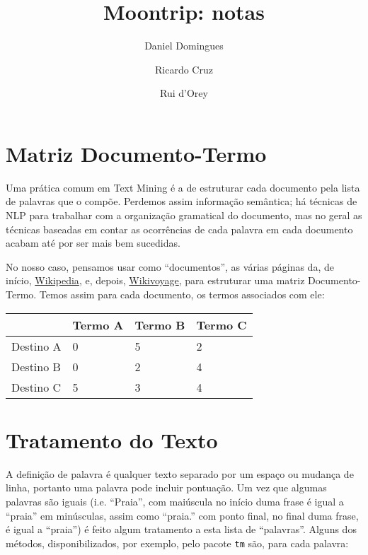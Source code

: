 \documentclass[twocolumn]{article}
\title{Moontrip: notas}
\author{Daniel Domingues \and Ricardo Cruz \and Rui d'Orey}
\begin{document}
\maketitle

\section{Matriz Documento-Termo}

Uma prática comum em Text Mining é a de estruturar cada documento pela lista de palavras que o compõe. Perdemos assim informação semântica; há técnicas de NLP para trabalhar com a organização gramatical do documento, mas no geral as técnicas baseadas em contar as ocorrências de cada palavra em cada documento acabam até por ser mais bem sucedidas.

No nosso caso, pensamos usar como ``documentos'', as várias páginas da, de início, \href{http://wikipedia.org}{Wikipedia}, e, depois, \href{http://wikivoyage.org}{Wikivoyage}, para estruturar uma matriz Documento-Termo. Temos assim para cada documento, os termos associados com ele:

\noindent
\begin{center}
\begin{tabular}{|l|l|l|l|}
\hline
	& Termo A & Termo B & Termo C \\\hline
	Destino A & 0 & 5 & 2 \\\hline
	Destino B & 0 & 2 & 4 \\\hline
	Destino C & 5 & 3 & 4 \\\hline
\end{tabular}
\end{center}

\section{Tratamento do Texto}

A definição de palavra é qualquer texto separado por um espaço ou mudança de linha, portanto uma palavra pode incluir pontuação. Um vez que algumas palavras são iguais (i.e. ``Praia'', com maiúscula no início duma frase é igual a ``praia'' em minúsculas, assim como ``praia.'' com ponto final, no final duma frase, é igual a ``praia'') é feito algum tratamento a esta lista de ``palavras''. Alguns dos métodos, disponibilizados, por exemplo, pelo pacote \texttt{tm} são, para cada palavra:
\end{document}
